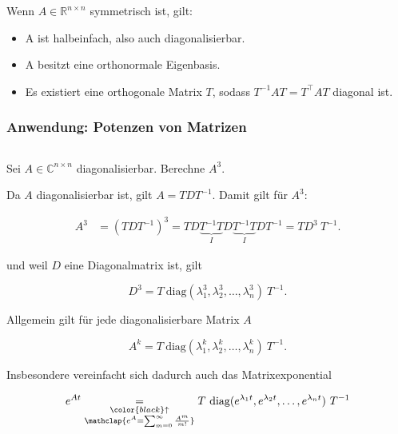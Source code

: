 Wenn \( A \in \mathbb{R}^{n \times n} \)  symmetrisch ist, gilt:

\begin{itemize}
    \item A ist halbeinfach, also auch diagonalisierbar.
    \item A besitzt eine orthonormale Eigenbasis.
    \item Es existiert eine orthogonale Matrix \( T \), sodass \( T^{-1} A T = T^\top A T \) diagonal ist.
\end{itemize}

\subsubsection{Anwendung: Potenzen von Matrizen} \( \ \)

\vspace{0.5\baselineskip}

Sei \( A \in \mathbb{C}^{n \times n} \) diagonalisierbar. Berechne \( A^3 \). 

\vspace{1\baselineskip}

Da \( A \) diagonalisierbar ist, gilt \( A = T D T^{-1} \). Damit gilt für \( A^3 \):

\begin{equation*}
    \begin{aligned}
        A^3 &= (T D T^{-1})^3 = T D \underbrace{T^{-1} T}_{I} D \underbrace{T^{-1} T}_{I} D T^{-1} = T D^3 \ T^{-1}.
    \end{aligned}
\end{equation*} 

und weil \( D \) eine Diagonalmatrix ist, gilt

\begin{equation*}
    D^3 = T \ \text{diag}(\lambda_1^3, \lambda_2^3, \dots, \lambda_n^3) \ T^{-1}.
\end{equation*}

Allgemein gilt für jede diagonalisierbare Matrix \( A \)

\begin{equation*}
    A^k = T \ \text{diag}(\lambda_1^k, \lambda_2^k, \dots, \lambda_n^k) \ T^{-1}.
\end{equation*}

Insbesondere vereinfacht sich dadurch auch das Matrixexponential

\begin{equation*}
    e^{At} \underset{\substack{\color{black}\uparrow \\
                       \mathclap{e^A = \sum_{m=0}^{\infty} \frac{A^m}{m!}}}}{=}T \ \text{diag}(e^{\lambda_1 t}, e^{\lambda_2 t}, \dots, e^{\lambda_n t}) \ T^{-1}
\end{equation*}
